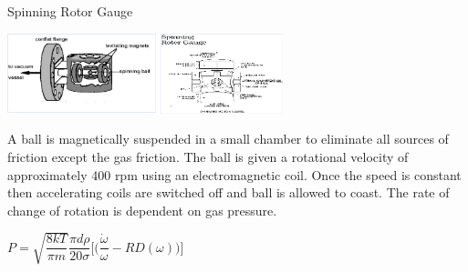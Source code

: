 \documentclass[11pt]{beamer}
\begin{document}
\begin{frame}{Spinning Rotor Gauge}
				\begin{center}
						\includegraphics[width=0.6\textwidth]{SpinningRotor.png}
				\end{center}

A ball is magnetically suspended in a small chamber to  eliminate all  sources of friction except the gas friction. The ball is given a rotational velocity of approximately 400 rpm using an electromagnetic coil. Once the speed is constant then accelerating coils are switched off and ball is allowed to coast. The rate of change of rotation is dependent on gas pressure.\\
\begin{center}
$P=\sqrt{\dfrac{8kT}{\pi m}} \dfrac{\pi d \rho}{20 \sigma} \big [\big (\dfrac{\dot{\omega}}{\omega}-RD(\omega))]$
\end{center}




\end{frame}
\end{document}
